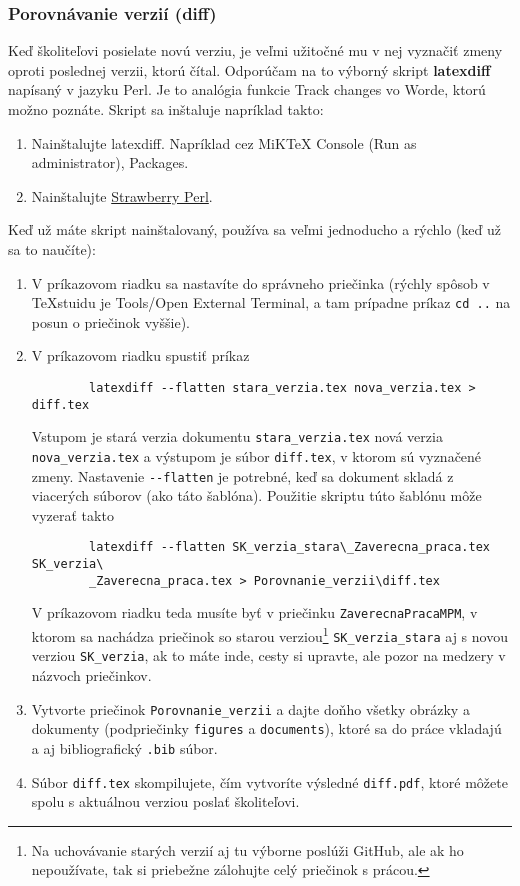 \subsubsection{Porovnávanie verzií (diff)}
Keď školiteľovi posielate novú verziu, je veľmi užitočné mu v nej vyznačiť zmeny oproti poslednej verzii, ktorú čítal. Odporúčam na to výborný skript \textbf{latexdiff} napísaný v jazyku Perl. Je to analógia funkcie Track changes vo Worde, ktorú možno poznáte. Skript sa inštaluje napríklad takto:
\begin{enumerate}
	\item Nainštalujte latexdiff. Napríklad cez MiKTeX Console (Run as administrator), Packages.
	\item Nainštalujte \href{https://strawberryperl.com/}{Strawberry Perl}.
\end{enumerate}
Keď už máte skript nainštalovaný, používa sa veľmi jednoducho a rýchlo (keď už sa to naučíte):
\begin{enumerate}
	\item V príkazovom riadku sa nastavíte do správneho priečinka (rýchly spôsob v TeXstuidu je Tools/Open External Terminal, a tam prípadne príkaz \verb|cd ..| na posun o priečinok vyššie).
	\item V príkazovom riadku spustiť príkaz
	\begin{verbatim}
		latexdiff --flatten stara_verzia.tex nova_verzia.tex > diff.tex
	\end{verbatim}
	Vstupom je stará verzia dokumentu \verb|stara_verzia.tex| nová verzia \verb|nova_verzia.tex| a výstupom je súbor \verb|diff.tex|, v ktorom sú vyznačené zmeny. Nastavenie \verb|--flatten| je potrebné, keď sa dokument skladá z viacerých súborov (ako táto šablóna). Použitie skriptu túto šablónu môže vyzerať takto
	\begin{verbatim}
		latexdiff --flatten SK_verzia_stara\_Zaverecna_praca.tex SK_verzia\
		_Zaverecna_praca.tex > Porovnanie_verzii\diff.tex
	\end{verbatim}
	V príkazovom riadku teda musíte byť v priečinku \verb|ZaverecnaPracaMPM|, v ktorom sa nachádza priečinok so starou verziou\footnote{Na uchovávanie starých verzií aj tu výborne poslúži GitHub, ale ak ho nepoužívate, tak si priebežne zálohujte celý priečinok s prácou.} \verb|SK_verzia_stara| aj s novou verziou \verb|SK_verzia|, ak to máte inde, cesty si upravte, ale pozor na medzery v názvoch priečinkov.
	\item Vytvorte priečinok \verb|Porovnanie_verzii| a dajte doňho všetky obrázky a dokumenty (podpriečinky \verb|figures| a \verb|documents|), ktoré sa do práce vkladajú a aj bibliografický \verb|.bib| súbor.
	\item Súbor \verb|diff.tex| skompilujete, čím vytvoríte výsledné \verb|diff.pdf|, ktoré môžete spolu s aktuálnou verziou poslať školiteľovi.
\end{enumerate}







